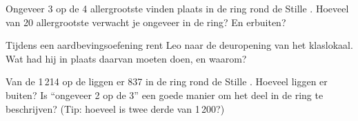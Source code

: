 \begin{exercise}[$\star\star$]\label{exo:g4:volcanoes-earthquakes-first-look:9}
Ongeveer 3 op de 4 allergrootste  vinden plaats in de ring rond
de Stille . Hoeveel van 20 allergrootste  verwacht je
ongeveer in de ring? En erbuiten?
\end{exercise}

\begin{exercise}[$\star\star$]\label{exo:g4:volcanoes-earthquakes-first-look:10}
Tijdens een aardbevingsoefening rent Leo naar de deuropening van het
klaslokaal. Wat had hij in plaats daarvan moeten doen, en waarom?
\end{exercise}

\begin{exercise}[$\star\star\star$]\label{exo:g4:volcanoes-earthquakes-first-look:11}
Van de 1\,214  op de  liggen er 837 in de ring rond de Stille
. Hoeveel liggen er buiten? Is ``ongeveer 2 op de 3'' een goede
manier om het deel in de ring te beschrijven? (Tip: hoeveel is twee derde
van 1\,200?)
\end{exercise}
